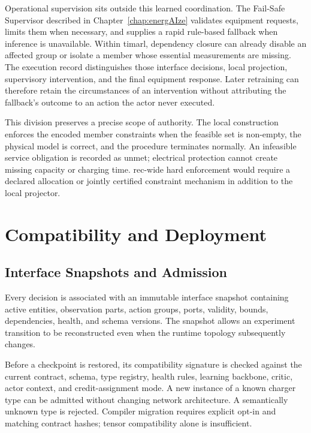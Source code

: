 Operational supervision sits outside this learned coordination. The Fail-Safe Supervisor described in Chapter~\ref{chap:energAIze} validates equipment requests, limits them when necessary, and supplies a rapid rule-based fallback when inference is unavailable. Within \gls{timarl}, dependency closure can already disable an affected group or isolate a member whose essential measurements are missing. The execution record distinguishes those interface decisions, local projection, supervisory intervention, and the final equipment response. Later retraining can therefore retain the circumstances of an intervention without attributing the fallback's outcome to an action the actor never executed.

This division preserves a precise scope of authority. The local construction enforces the encoded member constraints when the feasible set is non-empty, the physical model is correct, and the procedure terminates normally. An infeasible service obligation is recorded as unmet; electrical protection cannot create missing capacity or charging time. \gls{rec}-wide hard enforcement would require a declared allocation or jointly certified constraint mechanism in addition to the local projector.

\section{Compatibility and Deployment}
\label{sec:timarl-compatibility-explainability}

\subsection{Interface Snapshots and Admission}
\label{sec:timarl-compatibility}

Every decision is associated with an immutable interface snapshot containing active entities, observation parts, action groups, ports, validity, bounds, dependencies, health, and schema versions. The snapshot allows an experiment transition to be reconstructed even when the runtime topology subsequently changes.

Before a checkpoint is restored, its compatibility signature is checked against the current contract, schema, type registry, health rules, learning backbone, critic, actor context, and credit-assignment mode. A new instance of a known charger type can be admitted without changing network architecture. A semantically unknown type is rejected. Compiler migration requires explicit opt-in and matching contract hashes; tensor compatibility alone is insufficient.

